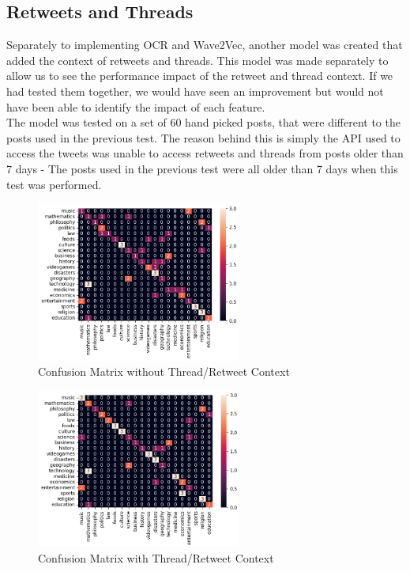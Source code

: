 \subsection{Retweets and Threads}
Separately to implementing OCR and Wave2Vec, another model was created that added the context of retweets and threads. This model was
made separately to allow us to see the performance impact of the retweet and thread context. If we had tested them together, we would
have seen an improvement but would not have been able to identify the impact of each feature.\\
The model was tested on a set of 60 hand picked posts, that were different to the posts used in the previous test. The reason behind
this is simply the API used to access the tweets was unable to access retweets and threads from posts older than 7 days - The posts
used in the previous test were all older than 7 days when this test was performed.
\begin{figure}
    \centering
    \includegraphics[width=0.6\textwidth]{../images/confusion/RoBERTa-nothread-20.png}
    \caption{Confusion Matrix without Thread/Retweet Context}
    \label{fig:confusion2}
\end{figure}
\begin{figure}
    \centering
    \includegraphics[width=0.6\textwidth]{../images/confusion/RoBERTa-thread-20.png}
    \caption{Confusion Matrix with Thread/Retweet Context}
    \label{fig:retweet}
\end{figure}

